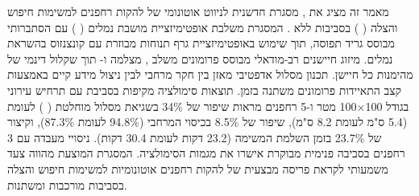 

מאמר זה מציג את 
,
 מסגרת חדשנית לניווט אוטונומי של להקות רחפנים למשימות חיפוש והצלה (
) בסביבות ללא 
.
 המסגרת משלבת אופטימיזציית מושבת נמלים (
) עם 
 הסתברותי מבוסס גריד תפוסה, תוך שימוש באופטימיזציית גרף תנוחות מבוזרת עם קונצנזוס בהשראת נמלים. מיזוג חיישנים רב-מודאלי מבוסס פרומונים משלב 
,
 מצלמה ו-
 תוך שקלול דינמי של מהימנות כל חיישן. תכנון מסלול אדפטיבי מאזן בין חקר מרחבי לבין ניצול מידע קיים באמצעות קצב התאיידות פרומונים משתנה בזמן. תוצאות סימולציה מקיפות בסביבת 
 עם תרחיש 
 עירוני בגודל 100×100 מטר ו-5 רחפנים מראות שיפור של 34\% בשגיאת מסלול מוחלטת (
) לעומת 
 (5.4 ס"מ לעומת 8.2 ס"מ), שיפור של 8.5\% בכיסוי המרחבי (94.8\% לעומת 87.3\%), וקיצור של 23.7\% בזמן השלמת המשימה (23.2 דקות לעומת 30.4 דקות). ניסויי מעבדה עם 3 רחפנים בסביבה פנימית מבוקרת אישרו את מגמות הסימולציה. המסגרת המוצעת מהווה צעד משמעותי לקראת פריסה מבצעית של להקות רחפנים אוטונומיות למשימות חיפוש והצלה בסביבות מורכבות ומשתנות.